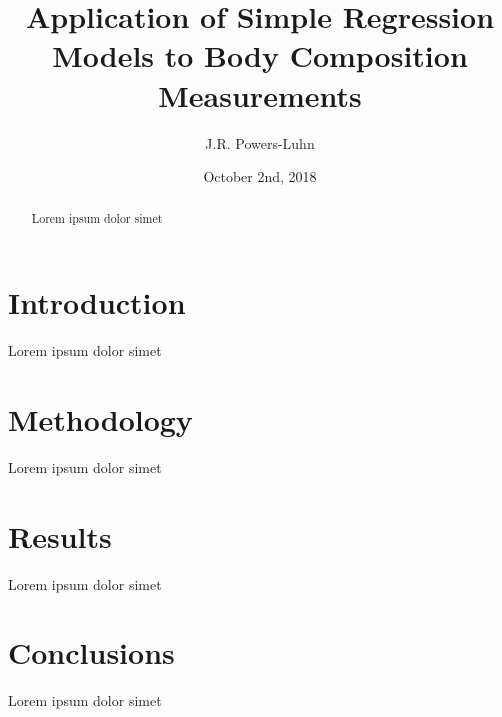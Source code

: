 \documentclass{IEEEtran}
\author{J.R. Powers-Luhn}
\title{Application of Simple Regression Models to Body Composition Measurements}
\date{October 2nd, 2018}
\begin{document}
\maketitle

\begin{abstract}

Lorem ipsum dolor simet

\end{abstract}

\section{Introduction}

Lorem ipsum dolor simet

\section{Methodology} 

Lorem ipsum dolor simet

\section{Results}

Lorem ipsum dolor simet

\section{Conclusions}

Lorem ipsum dolor simet

\printbibliography

%
\end{document}
